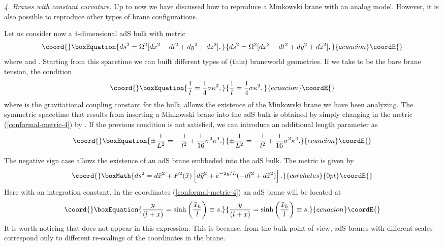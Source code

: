 \documentclass[a4paper,prl,showpacs,twocolumn]{revtex4}
\begin{document}
\noindent
{\it 4. Branes with constant curvature.}
Up to now we have discussed how to reproduce a Minkowski brane
with an analog model. However, it is also possible to reproduce
other types of brane configurations.  

Let us consider now a 4-dimensional adS bulk with metric
%
\begin{equation}\coord{}\boxEquation{
ds^2 =  \Omega^2[dx^2-dt^2+dy^2+dz^2], 
\label{conformal-metric-4}
}{
ds^2 =  \Omega^2[dx^2-dt^2+dy^2+dz^2], 
}{ecuacion}\coordE{}\end{equation}
%
where  \coordHE{} and
\coordHE{}.
Starting from this spacetime we can built different types of \coordHE{} 
(thin) braneworld geometries. If we take \myHighlight{$\sigma$}\coordHE{} to be 
the bare brane tension, the condition
%
\begin{equation}\coord{}\boxEquation{
{1 \over l}={1 \over 4 }\sigma \kappa^2,  
}{
{1 \over l}={1 \over 4 }\sigma \kappa^2,  
}{ecuacion}\coordE{}\end{equation}
%
where \coordHE{} is the gravitational coupling constant for the bulk, 
allows the existence of the Minkowski brane 
we have been analyzing. 
The \coordHE{} symmetric spacetime that results from inserting 
a Minkowski brane into the adS bulk is obtained by simply changing \coordHE{} 
in the metric (\ref{conformal-metric-4}) by \coordHE{}.
If the previous condition is not satisfied, we can introduce 
an additional length parameter \coordHE{} as
%
\begin{equation}\coord{}\boxEquation{
\pm {1 \over L^2}=-{1 \over l^2}+{1 \over 16}\sigma^2 \kappa^4.  
}{
\pm {1 \over L^2}=-{1 \over l^2}+{1 \over 16}\sigma^2 \kappa^4.  
}{ecuacion}\coordE{}\end{equation}
%

The negative sign case allows the existence of an adS
brane embbeded into the adS bulk. The metric is given by \cite{dewolfe}
%
\[\coord{}\boxMath{
ds^2 = d {\bar x}^2 + 
F^2({\bar x})
\left[ d{\bar y}^2+ e^{-2{\bar y}/L} 
(-d{\bar t}^2+d{\bar z}^2) \right].
}{corchetes}{0pt}\coordE{}\]
%
Here \coordHE{}
with \coordHE{} an integration constant.
In the coordinates (\ref{conformal-metric-4}) an adS
brane will be located at
%
\begin{equation}\coord{}\boxEquation{
{y \over (l+x)}=\sinh\left({{\bar x}_h \over l}\right)\equiv s.
}{
{y \over (l+x)}=\sinh\left({{\bar x}_h \over l}\right)\equiv s.
}{ecuacion}\coordE{}\end{equation}
%
It is worth noticing that \coordHE{} does not appear in this expression.
This is because, from the bulk point of view, adS branes 
with different scales \coordHE{} correspond only to different re-scalings of 
the coordinates in the brane. 
\end{document}
